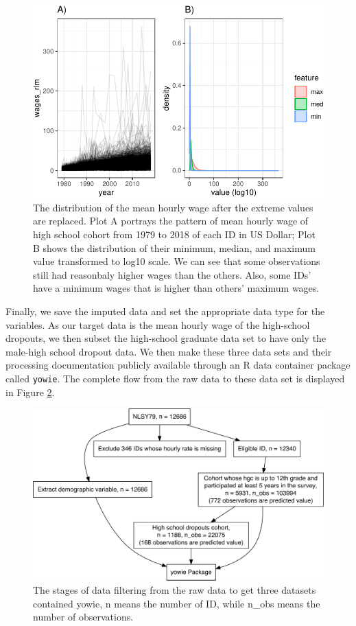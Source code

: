 \documentclass{article}
\begin{document}
\begin{figure}

{\centering \includegraphics[width=0.7\linewidth]{figures/comppict-1} 

}

\caption{The distribution of the mean hourly wage after the extreme values are replaced. Plot A portrays the pattern of mean hourly wage of high school cohort from 1979 to 2018 of each ID in US Dollar; Plot B shows the distribution of their minimum, median, and maximum value transformed to log10 scale. We can see that some observations still had reasonbaly higher wages than the others. Also, some IDs' have a minimum wages that is higher than others' maximum wages.}\label{fig:comppict}
\end{figure}

Finally, we save the imputed data and set the appropriate data type for the variables. As our target data is the mean hourly wage of the high-school dropouts, we then subset the high-school graduate data set to have only the male-high school dropout data. We then make these three data sets and their processing documentation publicly available through an R data container package called \texttt{yowie}. The complete flow from the raw data to these data set is displayed in Figure \ref{fig:flow-chart}.

\begin{figure}

{\centering \includegraphics[width=0.7\linewidth]{figures/flow-chart-1} 

}

\caption{The stages of data filtering from the raw data to get three datasets contained yowie, n means the number of ID, while n\_obs means the number of observations.}\label{fig:flow-chart}
\end{figure}
\end{document}
